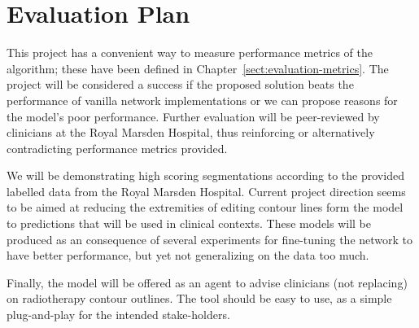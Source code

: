 \documentclass[11pt,twoside]{report}
\begin{document}
\section{Evaluation Plan}

This project has a convenient way to measure performance metrics of the algorithm; these have been defined in Chapter~\ref{sect:evaluation-metrics}. The project will be considered a success if the proposed solution beats the performance of vanilla network implementations or we can propose reasons for the model's poor performance. Further evaluation will be peer-reviewed by clinicians at the Royal Marsden Hospital, thus reinforcing or alternatively contradicting performance metrics provided.

We will be demonstrating high scoring segmentations according to the provided labelled data from the Royal Marsden Hospital. Current project direction seems to be aimed at reducing the extremities of editing contour lines form the model to predictions that will be used in clinical contexts. These models will be produced as an consequence of several experiments for fine-tuning the network to have better performance, but yet not generalizing on the data too much.

Finally, the model will be offered as an agent to advise clinicians (not replacing) on radiotherapy contour outlines. The tool should be easy to use, as a simple plug-and-play for the intended stake-holders. 

\printbibliography
{}
\end{document}
